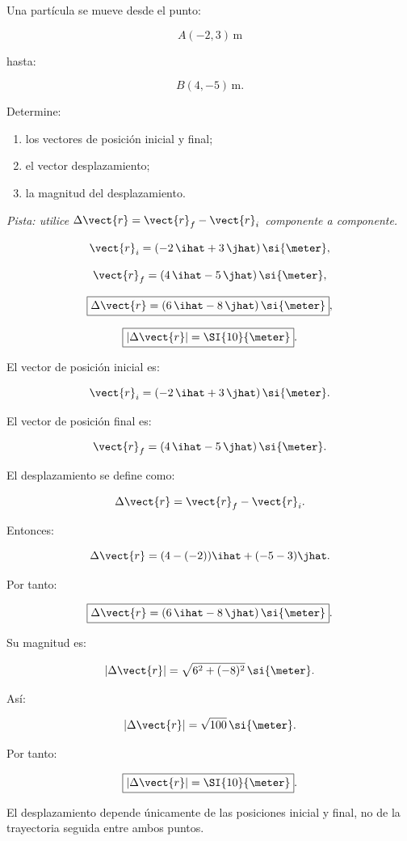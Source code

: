 \begin{ejercicio}
Una partícula se mueve desde el punto:

\[
A(-2,3)\,\si{\meter}
\]

hasta:

\[
B(4,-5)\,\si{\meter}.
\]

Determine:

\begin{enumerate}[label=\alph*)]
    \item los vectores de posición inicial y final;
    \item el vector desplazamiento;
    \item la magnitud del desplazamiento.
\end{enumerate}

\textit{Pista: utilice \(\Delta\vect{r}=\vect{r}_f-\vect{r}_i\) componente a componente.}
\end{ejercicio}

\begin{respuesta}
\[
\vect{r}_i=(-2\,\ihat+3\,\jhat)\,\si{\meter},
\]

\[
\vect{r}_f=(4\,\ihat-5\,\jhat)\,\si{\meter},
\]

\[
\boxed{\Delta\vect{r}=(6\,\ihat-8\,\jhat)\,\si{\meter}},
\]

\[
\boxed{|\Delta\vect{r}|=\SI{10}{\meter}}.
\]
\end{respuesta}

\begin{explicacion}
El vector de posición inicial es:

\[
\vect{r}_i
=
(-2\,\ihat+3\,\jhat)\,\si{\meter}.
\]

El vector de posición final es:

\[
\vect{r}_f
=
(4\,\ihat-5\,\jhat)\,\si{\meter}.
\]

El desplazamiento se define como:

\[
\Delta\vect{r}
=
\vect{r}_f-\vect{r}_i.
\]

Entonces:

\[
\Delta\vect{r}
=
(4-(-2))\ihat
+
(-5-3)\jhat.
\]

Por tanto:

\[
\boxed{
\Delta\vect{r}
=
(6\,\ihat-8\,\jhat)\,\si{\meter}
}.
\]

Su magnitud es:

\[
|\Delta\vect{r}|
=
\sqrt{6^2+(-8)^2}\,\si{\meter}.
\]

Así:

\[
|\Delta\vect{r}|
=
\sqrt{100}\,\si{\meter}.
\]

Por tanto:

\[
\boxed{|\Delta\vect{r}|=\SI{10}{\meter}}.
\]

El desplazamiento depende únicamente de las posiciones inicial y final, no de la trayectoria seguida entre ambos puntos.
\end{explicacion}


